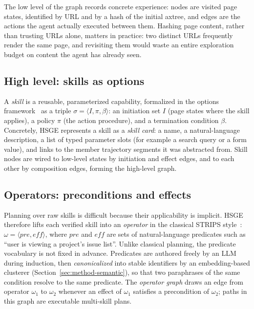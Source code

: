 The low level of the graph records concrete experience: nodes are visited
page states, identified by URL and by a hash of the initial axtree, and edges
are the actions the agent actually executed between them. Hashing page
content, rather than trusting URLs alone, matters in practice: two distinct
URLs frequently render the same page, and revisiting them would waste an
entire exploration budget on content the agent has already seen.

\subsection{High level: skills as options}

A \emph{skill} is a reusable, parameterized capability, formalized in the
options framework~\cite{sutton1999options} as a triple
$\sigma = \langle I, \pi, \beta \rangle$: an initiation set $I$ (page states
where the skill applies), a policy $\pi$ (the action procedure), and a
termination condition $\beta$. Concretely, HSGE represents a skill as a
\emph{skill card}: a name, a natural-language description, a list of typed
parameter slots (for example a search query or a form value), and links to
the member trajectory segments it was abstracted from. Skill nodes are wired
to low-level states by initiation and effect edges, and to each other by
composition edges, forming the high-level graph.

\subsection{Operators: preconditions and effects}

Planning over raw skills is difficult because their applicability is
implicit. HSGE therefore lifts each verified skill into an
\emph{operator} in the classical STRIPS style~\cite{fikes1971strips}:
$\omega = \langle \mathit{pre}, \mathit{eff} \rangle$, where $\mathit{pre}$
and $\mathit{eff}$ are sets of natural-language predicates such as ``user is
viewing a project's issue list''. Unlike classical planning, the predicate
vocabulary is not fixed in advance. Predicates are authored freely by an LLM
during induction, then \emph{canonicalized} into stable identifiers by an
embedding-based clusterer (Section~\ref{sec:method-semantic}), so that two
paraphrases of the same condition resolve to the same predicate. The
\emph{operator graph} draws an edge from operator $\omega_1$ to $\omega_2$
whenever an effect of $\omega_1$ satisfies a precondition of $\omega_2$;
paths in this graph are executable multi-skill plans.

